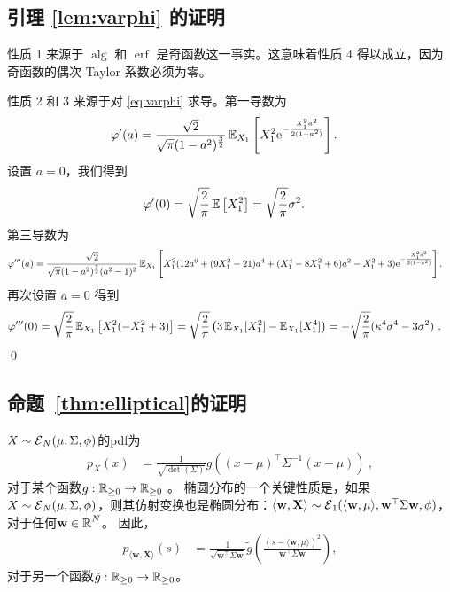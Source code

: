 \subsection{引理 \ref{lem:varphi} 的证明} \label{subsec:pf_of_varphi}
性质 1 来源于 $\operatorname{alg}$ 和 $\operatorname{erf}$ 是奇函数这一事实。这意味着性质 4 得以成立，因为奇函数的偶次 Taylor 系数必须为零。

性质 2 和 3 来源于对 \cref{eq:varphi} 求导。第一导数为
\begin{align*}
    \varphi'(a) &= \frac{\sqrt{2}}{{\sqrt{{\pi}}}(1-a^2)^\frac{3}{2}} \operatorname{\mathbb{E}}_{X_1}\left[ X_1^2\mathrm{e}^{-\frac{X_1^2a^2}{2(1-a^2)}} \right].
\end{align*}
设置 $a = 0$，我们得到
\begin{align*}
    \varphi'(0)
    &= \sqrt{\frac{2}{\pi}} \operatorname{\mathbb{E}}\left[ X_1^2 \right]
    = \sqrt{\frac{2}{\pi}} \sigma^2.
\end{align*}
第三导数为
\begin{align*}
    \varphi'''(a) &= \frac{\sqrt{2}}{\sqrt{{\pi}}(1-a^2)^\frac{7}{2}(a^2-1)^2} \operatorname{\mathbb{E}}_{X_1} \left[
    X_1^2(12a^6+(9X_1^2-21)a^4+(X_1^4-8X_1^2+6)a^2-X_1^2+3)\mathrm{e}^{-\frac{X_1^2a^2}{2(1-a^2)}}
    \right].
\end{align*}
再次设置 $a = 0$ 得到
\begin{align*}
    \varphi'''(0) &= \sqrt{\frac{2}{\pi}} \operatorname{\mathbb{E}}_{X_1} \left[ X_1^2(-X_1^2+3) \right]
    = \sqrt{\frac{2}{\pi}} \left( 3 \operatorname{\mathbb{E}}_{X_1}[X_1^2] - \operatorname{\mathbb{E}}_{X_1}[X_1^4] \right)
    = -\sqrt{\frac{2}{\pi}} (\kappa^4 \sigma^4 - 3 \sigma^2)~.
\end{align*}
\qed
\subsection{命题~\ref{thm:elliptical}的证明}
$X \sim \operatorname{\mathcal{E}}_N(\mu, \Sigma, \phi)$的pdf为
\begin{align*}
    p_X(x) &= \frac{1}{\sqrt{\det(\Sigma)}} g( (x-\mu)^\top \Sigma^{-1} (x-\mu) )~,
\end{align*}
对于某个函数$g : \operatorname{\mathbb{R}}_{\geq 0} \to \operatorname{\mathbb{R}}_{\geq 0}$ \cite{frahm2004generalized}。
椭圆分布的一个关键性质是，如果$X \sim \operatorname{\mathcal{E}}_N(\mu, \Sigma, \phi)$，则其仿射变换也是椭圆分布：$\langle \mathbf{w}, \mathbf{X} \rangle \sim \operatorname{\mathcal{E}}_1(\langle \mathbf{w}, \mu \rangle, \mathbf{w}^\top \Sigma \mathbf{w}, \phi)$，对于任何$\mathbf{w} \in \operatorname{\mathbb{R}}^N$。
因此，
\begin{align*}
  p_{\langle \mathbf{w}, \mathbf{X} \rangle}(s) &= \frac{1}{\sqrt{\mathbf{w}^\top \Sigma \mathbf{w}}} \tilde{g}\left( \frac{(s-\langle \mathbf{w}, \mu \rangle)^2}{\mathbf{w}^\top \Sigma \mathbf{w}} \right),
\end{align*}
对于另一个函数$\tilde{g} : \operatorname{\mathbb{R}}_{\geq 0} \to \operatorname{\mathbb{R}}_{\geq 0}$。

